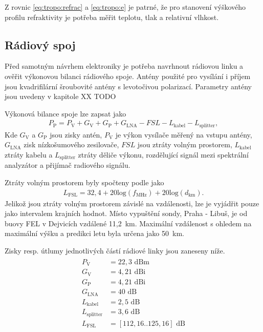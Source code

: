 \documentclass[twoside]{ctuthesis}
\newcommand{\mt}[1]{\text{#1}}
\theoremstyle{plain}
\theoremstyle{definition}
\theoremstyle{note}
\begin{document}
		Z rovnic \eqref{eq:tropo:refrac} a \eqref{eq:tropo:e} je patrné, že pro stanovení výškového profilu refraktivity je potřeba měřit teplotu, tlak a relativní vlhkost. 



		\subsection{Rádiový spoj}
		Před samotným návrhem elektroniky je potřeba navrhnout rádiovou linku a ověřit výkonovou bilanci rádiového spoje. Antény použité pro vysílání i příjem jsou kvadrifilární šroubovité antény s levotočivou polarizací. Parametry antény jsou uvedeny v kapitole XX TODO

		Výkonová bilance spoje lze zapsat jako
		\begin{align}
			P_\mt{P} = P_\mt{V} + G_\mt{V} + G_\mt{P} + G_\mt{LNA} - FSL - L_\mt{kabel} - L_\mt{splitter},
			\label{eq:bilance}
		\end{align}
		Kde $G_\mt{V}$ a $G_\mt{P}$ jsou zisky antén, $P_\mt{V}$ je výkon vysílače měřený na vstupu antény, $G_\mt{LNA}$ zisk nízkošumového zesilovače, $FSL$ jsou ztráty volným prostorem, $L_\mt{kabel}$ ztráty kabelu a $L_\mt{splitter}$ ztráty děliče výkonu, rozdělující signál mezi spektrální analyzátor a přijímač radiového signálu.

		Ztráty volným prostorem byly spočteny podle \cite{zaklady:sireni:vln} jako
		\begin{align}
			L_\mt{FSL} = 32,4 + 20\mt{log}(f_\mt{MHz}) + 20\mt{log}(d_\mt{km}).
		\end{align}
		Jelikož jsou ztráty volným prostorem závislé na vzdálenosti, lze je vyjádřit pouze jako intervalem krajních hodnot. Místo vypuštění sondy, Praha - Libuš, je od buovy FEL v Dejvicích vzdálené 11,2~km. Maximální vzdálenost s ohledem na maximální výšku a predikci letu byla určena jako 50~km.

		Zisky resp. útlumy jednotlivých částí rádiové linky jsou zaneseny níže.
		\begin{align*}
			\begin{split}
				P_\mt{V} &= 22{,}3\mt{ dBm}\\
				G_\mt{V} &= 4{,}21\mt{ dBi}\\
				G_\mt{P} &= 4{,}21\mt{ dBi}\\
				G_\mt{LNA} &= 40 \mt{ dB}\\
				L_\mt{kabel} &= 2{,}5\mt{ dB}\\
				L_\mt{splitter} &= 3{,}6\mt{ dB}\\
				L_\mt{FSL} &= [112{,}16 .. 125{,}16]\mt{ dB}
			\end{split}
		\end{align*}
\end{document}
